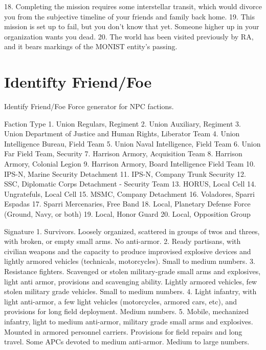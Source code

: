                                                                                                                


    18. Completing the mission requires some interstellar transit, which would divorce you from  
        the subjective timeline of your friends and family back home.   
    19. This mission is set up to fail, but you don’t know that yet. Someone higher up in your  
        organization wants you dead.   
    20. The world has been visited previously by RA, and it bears markings of the MONIST entity's  
        passing.  

\section{Identifty Friend/Foe}

Identify Friend/Foe  
Force generator for NPC factions.   

Faction Type   
    1.  Union Regulars, Regiment   
    2.  Union Auxiliary, Regiment  
    3.  Union Department of Justice and Human Rights, Liberator Team   
    4.  Union Intelligence Bureau, Field Team  
    5.  Union Naval Intelligence, Field Team  
    6.  Union Far Field Team, Security   
    7.  Harrison Armory, Acquisition Team  
    8.  Harrison Armory, Colonial Legion  
    9.  Harrison Armory, Board Intelligence Field Team  
    10. IPS-N, Marine Security Detachment   
    11. IPS-N, Company Trunk Security  
    12. SSC, Diplomatic Corps Detachment - Security Team    
    13. HORUS, Local Cell   
    14. Ungratefuls, Local Cell    
    15. MSMC, Company Detachment   
    16. Voladores, Sparri Espadas   
    17. Sparri Mercenaries, Free Band   
    18. Local, Planetary Defense Force (Ground, Navy, or both)   
    19. Local, Honor Guard  
    20. Local, Opposition Group   

Signature  
    1.  Survivors. Loosely organized, scattered in groups of twos and threes, with broken, or  
        empty small arms. No anti-armor.   
    2.  Ready partisans, with civilian weapons and the capacity to produce improvised explosive  
        devices and lightly armored vehicles (technicals, motorcycles). Small to medium numbers.   
    3.  Resistance fighters. Scavenged or stolen military-grade small arms and explosives, light  
        anti armor, provisions and scavenging ability. Lightly armored vehicles, few stolen military  
        grade vehicles. Small to medium numbers.   
    4.  Light infantry, with light anti-armor, a few light vehicles (motorcycles, armored cars, etc),  
        and provisions for long field deployment. Medium numbers.   
    5.  Mobile, mechanized infantry, light to medium anti-armor, military grade small arms and  
        explosives. Mounted in armored personnel carriers. Provisions for field repairs and long  
        travel. Some APCs devoted to medium anti-armor. Medium to large numbers.    

